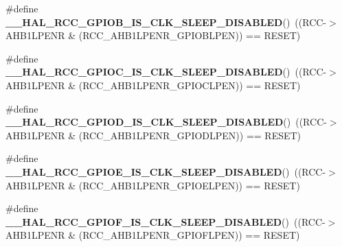 \begin{DoxyCompactItemize}
\item 
\mbox{\label{group___r_c_c___clock___sleep___enable___disable___status_ga2eac033c5d40d9e6eda85985322ece6f}} 
\#define {\bfseries \+\_\+\+\_\+\+H\+A\+L\+\_\+\+R\+C\+C\+\_\+\+G\+P\+I\+O\+B\+\_\+\+I\+S\+\_\+\+C\+L\+K\+\_\+\+S\+L\+E\+E\+P\+\_\+\+D\+I\+S\+A\+B\+L\+ED}()~((R\+CC-\/$>$A\+H\+B1\+L\+P\+E\+NR \& (R\+C\+C\+\_\+\+A\+H\+B1\+L\+P\+E\+N\+R\+\_\+\+G\+P\+I\+O\+B\+L\+P\+EN)) == R\+E\+S\+ET)
\item 
\mbox{\label{group___r_c_c___clock___sleep___enable___disable___status_ga4dd6a13690da372d5ea52476d0f972c8}} 
\#define {\bfseries \+\_\+\+\_\+\+H\+A\+L\+\_\+\+R\+C\+C\+\_\+\+G\+P\+I\+O\+C\+\_\+\+I\+S\+\_\+\+C\+L\+K\+\_\+\+S\+L\+E\+E\+P\+\_\+\+D\+I\+S\+A\+B\+L\+ED}()~((R\+CC-\/$>$A\+H\+B1\+L\+P\+E\+NR \& (R\+C\+C\+\_\+\+A\+H\+B1\+L\+P\+E\+N\+R\+\_\+\+G\+P\+I\+O\+C\+L\+P\+EN)) == R\+E\+S\+ET)
\item 
\mbox{\label{group___r_c_c___clock___sleep___enable___disable___status_gafdc54fb0d223358257ea5c9f2d9c2db6}} 
\#define {\bfseries \+\_\+\+\_\+\+H\+A\+L\+\_\+\+R\+C\+C\+\_\+\+G\+P\+I\+O\+D\+\_\+\+I\+S\+\_\+\+C\+L\+K\+\_\+\+S\+L\+E\+E\+P\+\_\+\+D\+I\+S\+A\+B\+L\+ED}()~((R\+CC-\/$>$A\+H\+B1\+L\+P\+E\+NR \& (R\+C\+C\+\_\+\+A\+H\+B1\+L\+P\+E\+N\+R\+\_\+\+G\+P\+I\+O\+D\+L\+P\+EN)) == R\+E\+S\+ET)
\item 
\mbox{\label{group___r_c_c___clock___sleep___enable___disable___status_gaf8ff1048471b8b380eed743946d73b73}} 
\#define {\bfseries \+\_\+\+\_\+\+H\+A\+L\+\_\+\+R\+C\+C\+\_\+\+G\+P\+I\+O\+E\+\_\+\+I\+S\+\_\+\+C\+L\+K\+\_\+\+S\+L\+E\+E\+P\+\_\+\+D\+I\+S\+A\+B\+L\+ED}()~((R\+CC-\/$>$A\+H\+B1\+L\+P\+E\+NR \& (R\+C\+C\+\_\+\+A\+H\+B1\+L\+P\+E\+N\+R\+\_\+\+G\+P\+I\+O\+E\+L\+P\+EN)) == R\+E\+S\+ET)
\item 
\mbox{\label{group___r_c_c___clock___sleep___enable___disable___status_gac1d248974d2d16be159c52beb41bb648}} 
\#define {\bfseries \+\_\+\+\_\+\+H\+A\+L\+\_\+\+R\+C\+C\+\_\+\+G\+P\+I\+O\+F\+\_\+\+I\+S\+\_\+\+C\+L\+K\+\_\+\+S\+L\+E\+E\+P\+\_\+\+D\+I\+S\+A\+B\+L\+ED}()~((R\+CC-\/$>$A\+H\+B1\+L\+P\+E\+NR \& (R\+C\+C\+\_\+\+A\+H\+B1\+L\+P\+E\+N\+R\+\_\+\+G\+P\+I\+O\+F\+L\+P\+EN)) == R\+E\+S\+ET)

\end{DoxyCompactItemize}
